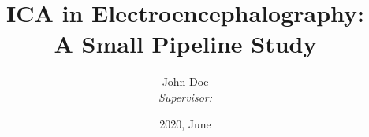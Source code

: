 \documentclass[11pt]{article}
\title{ICA in Electroencephalography: \\ A Small Pipeline Study}
\author{John Doe \\ \footnotesize{\textit{Supervisor: }}}
\date{2020, June}
\begin{document}
	\maketitle

	


	\begin{center}
	\begin{minipage}{0.75\textwidth}
		{\hypersetup{linkcolor=black} %
		\setcounter{tocdepth}{1}
		\tableofcontents}
	\end{minipage}
	\end{center}
	\clearpage

	

	

	

	

	\appendix

	

\appendix

	
\end{document}
